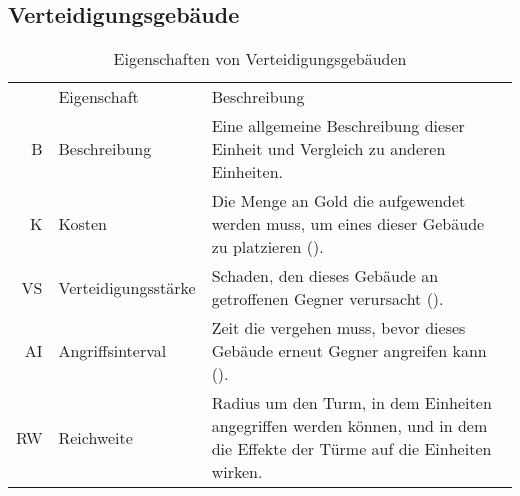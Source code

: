 \subsection{Verteidigungsgebäude}

\begingroup
  \small
  \begin{longtabu}{rlX}
    \rowfont{\normalsize}
    \caption{Eigenschaften von Verteidigungsgebäuden\label{tab:defend-props}}\\

    \midrule[\heavyrulewidth]\rowfont{\itshape}
    & Eigenschaft & Beschreibung \\
    \midrule

    B  & Beschreibung
       & Eine allgemeine Beschreibung dieser Einheit und Vergleich zu anderen
         Einheiten. \\
    K  & Kosten
       & Die Menge an Gold die aufgewendet werden muss, um eines dieser
         Gebäude zu platzieren (). \\
    VS & Verteidigungsstärke
       & Schaden, den dieses Gebäude an getroffenen Gegner verursacht
         (). \\
    AI & Angriffsinterval
       & Zeit die vergehen muss, bevor dieses Gebäude erneut Gegner angreifen
         kann (). \\
    RW & Reichweite
       & Radius um den Turm, in dem Einheiten angegriffen werden können, und in
         dem die Effekte der Türme auf die Einheiten wirken. \\

    \bottomrule
  \end{longtabu}
\endgroup

